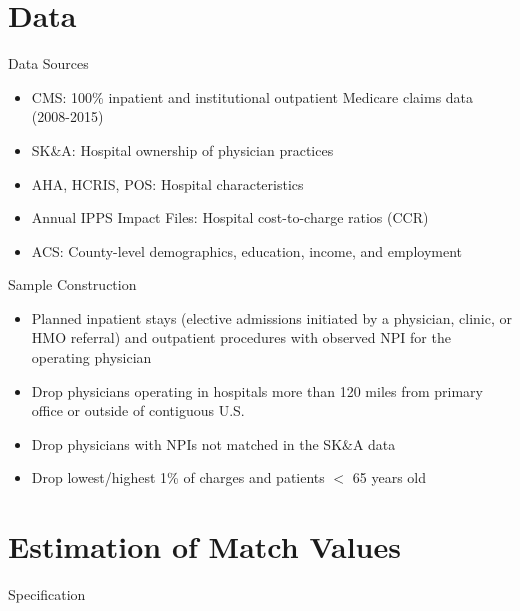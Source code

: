 \documentclass[t,aspectratio=169]{beamer}
\begin{document}
\section{Data}
\begin{frame}{Data Sources}
    \begin{itemize}
        \item CMS: 100\% inpatient and institutional outpatient Medicare claims data (2008-2015)
        \item SK\&A: Hospital ownership of physician practices
        \item AHA, HCRIS, POS: Hospital characteristics
        \item Annual IPPS Impact Files: Hospital cost-to-charge ratios (CCR)
        \item ACS: County-level demographics, education, income, and employment
    \end{itemize}
\end{frame}

\begin{frame}{Sample Construction}
    \begin{itemize}
        \item<1-> Planned inpatient stays (elective admissions initiated by a physician, clinic, or HMO referral) and outpatient procedures with observed NPI for the operating physician
        \item<2-> Drop physicians operating in hospitals more than 120 miles from primary office or outside of contiguous U.S.
        \item<3-> Drop physicians with NPIs not matched in the SK\&A data
        \item<4-> Drop lowest/highest 1\% of charges and patients $<$ 65 years old
    \end{itemize}
\end{frame}



\section{Estimation of Match Values}
\begin{frame}{Specification}
\end{frame}
\end{document}

